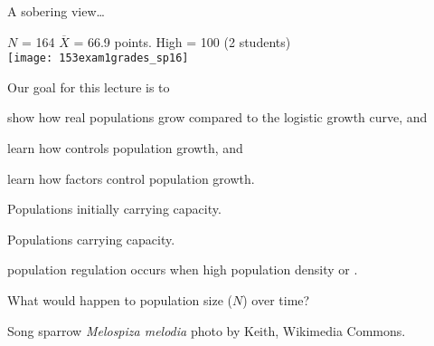 \documentclass[t]{beamer}
\begin{document}
\begin{frame}[t]{A sobering view\dots}

	\vspace*{-\baselineskip}
	
	\hangpara $N$ = 164 \hfill $\overline{X}$ = 66.9  points. \hfill High = 100 (2 students)\\[2ex]

	\texttt{[image: 153exam1grades\_sp16]}
	
\end{frame}

\begin{frame}{Our goal for this lecture is to}

	\hangpara show how real populations grow compared to the logistic growth curve, and
	
	\hangpara learn how  controls  population growth, and
	
	\hangpara learn how  factors control population growth.
	
\end{frame}

{
\begin{frame}{Populations initially  carrying capacity.}
\end{frame}
}

{
\begin{frame}{Populations  carrying capacity.}
\end{frame}
}


\begin{frame}{}

	\hangpara {} population regulation occurs when high population density  or .
	
	\hangpara What would happen to population size ($N$) over time?
	
\end{frame}

{
\begin{frame}[b]{}
\Tiny\textcolor{gray!20!white}{Song sparrow \textit{Melospiza melodia} photo by Keith, Wikimedia Commons.}
\end{frame}
}
\end{document}
